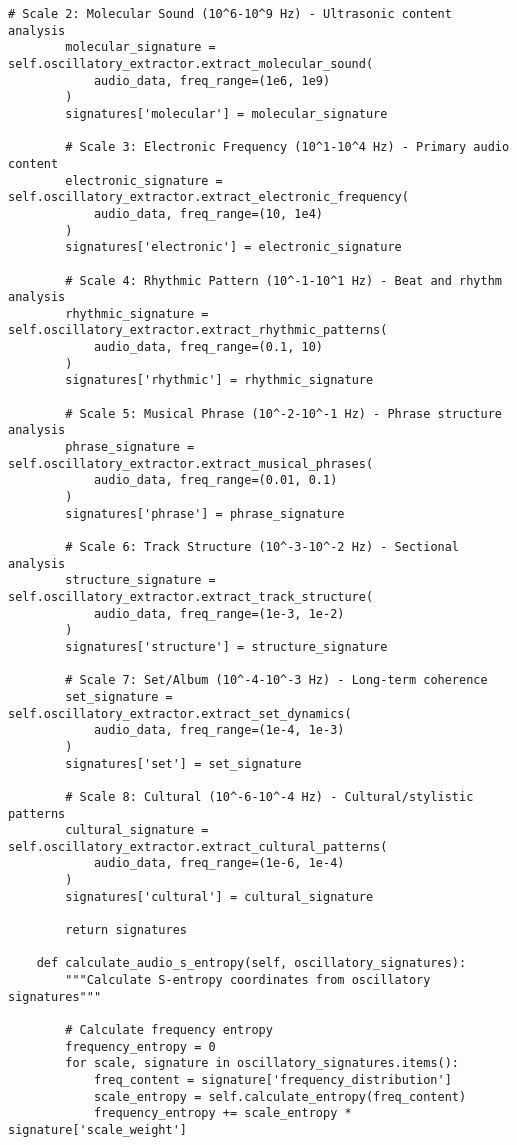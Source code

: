 \documentclass[12pt,a4paper]{article}
\begin{document}
\begin{lstlisting}[style=pythonstyle, caption=Core Audio-to-Drip Implementation]
        # Scale 2: Molecular Sound (10^6-10^9 Hz) - Ultrasonic content analysis  
        molecular_signature = self.oscillatory_extractor.extract_molecular_sound(
            audio_data, freq_range=(1e6, 1e9)
        )
        signatures['molecular'] = molecular_signature
        
        # Scale 3: Electronic Frequency (10^1-10^4 Hz) - Primary audio content
        electronic_signature = self.oscillatory_extractor.extract_electronic_frequency(
            audio_data, freq_range=(10, 1e4)
        )
        signatures['electronic'] = electronic_signature
        
        # Scale 4: Rhythmic Pattern (10^-1-10^1 Hz) - Beat and rhythm analysis
        rhythmic_signature = self.oscillatory_extractor.extract_rhythmic_patterns(
            audio_data, freq_range=(0.1, 10)
        )
        signatures['rhythmic'] = rhythmic_signature
        
        # Scale 5: Musical Phrase (10^-2-10^-1 Hz) - Phrase structure analysis
        phrase_signature = self.oscillatory_extractor.extract_musical_phrases(
            audio_data, freq_range=(0.01, 0.1)
        )
        signatures['phrase'] = phrase_signature
        
        # Scale 6: Track Structure (10^-3-10^-2 Hz) - Sectional analysis
        structure_signature = self.oscillatory_extractor.extract_track_structure(
            audio_data, freq_range=(1e-3, 1e-2)
        )
        signatures['structure'] = structure_signature
        
        # Scale 7: Set/Album (10^-4-10^-3 Hz) - Long-term coherence
        set_signature = self.oscillatory_extractor.extract_set_dynamics(
            audio_data, freq_range=(1e-4, 1e-3)
        )
        signatures['set'] = set_signature
        
        # Scale 8: Cultural (10^-6-10^-4 Hz) - Cultural/stylistic patterns
        cultural_signature = self.oscillatory_extractor.extract_cultural_patterns(
            audio_data, freq_range=(1e-6, 1e-4)
        )
        signatures['cultural'] = cultural_signature
        
        return signatures
    
    def calculate_audio_s_entropy(self, oscillatory_signatures):
        """Calculate S-entropy coordinates from oscillatory signatures"""
        
        # Calculate frequency entropy
        frequency_entropy = 0
        for scale, signature in oscillatory_signatures.items():
            freq_content = signature['frequency_distribution']
            scale_entropy = self.calculate_entropy(freq_content)
            frequency_entropy += scale_entropy * signature['scale_weight']
        

\end{lstlisting}
\end{document}
